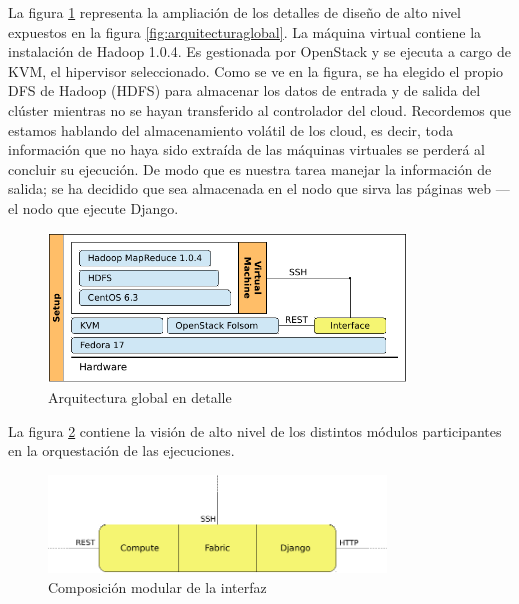 La figura \ref{fig:arquitecturadetalle} representa la ampliaci\'on de los detalles de dise\~no de alto nivel expuestos en la figura \ref{fig:arquitecturaglobal}. La m\'aquina virtual contiene la instalaci\'on de Hadoop 1.0.4. Es gestionada por OpenStack y se ejecuta a cargo de KVM, el hipervisor seleccionado. Como se ve en la figura, se ha elegido el propio DFS de Hadoop (HDFS) para almacenar los datos de entrada y de salida del cl\'uster mientras no se hayan transferido al controlador del cloud. Recordemos que estamos hablando del almacenamiento vol\'atil de los cloud, es decir, toda informaci\'on que no haya sido extra\'ida de las m\'aquinas virtuales se perder\'a al concluir su ejecuci\'on. De modo que es nuestra tarea manejar la informaci\'on de salida; se ha decidido que sea almacenada en el nodo que sirva las p\'aginas web ---el nodo que ejecute Django.\newline

\begin{figure}[tbp]
\begin{center}
\includegraphics[width=0.85\textwidth]{imagenes/022.pdf}
 \caption{Arquitectura global en detalle}
\label{fig:arquitecturadetalle}
\end{center}
\end{figure}

La figura \ref{fig:arquitecturainterfaz} contiene la visi\'on de alto nivel de los distintos m\'odulos participantes en la orquestaci\'on de las ejecuciones.

\begin{figure}[bp]
\begin{center}
\includegraphics[width=0.8\textwidth]{imagenes/023.pdf}
 \caption{Composici\'on modular de la interfaz}
\label{fig:arquitecturainterfaz}
\end{center}
\end{figure}

